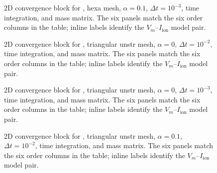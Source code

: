 \begin{figure}[p]
\centering
{}
\caption{2D convergence block for , hexa mesh, $\alpha=0.1$, $\Delta t=10^{-3}$,  time integration, and  mass matrix. The six panels match the six order columns in the table; inline labels identify the $V_m$--$I_{\mathrm{ion}}$ model pair.}
\label{fig:results-2d-picard-hexa-alpha-1p0em01-1p0em03}
\end{figure}
\FloatBarrier

\begin{figure}[p]
\centering
{}
\caption{2D convergence block for , triangular unstr mesh, $\alpha=0$, $\Delta t=10^{-2}$,  time integration, and  mass matrix. The six panels match the six order columns in the table; inline labels identify the $V_m$--$I_{\mathrm{ion}}$ model pair.}
\label{fig:results-2d-picard-triangular-unstr-alpha-0p0e00-1p0em02}
\end{figure}
\FloatBarrier

\begin{figure}[p]
\centering
{}
\caption{2D convergence block for , triangular unstr mesh, $\alpha=0$, $\Delta t=10^{-3}$,  time integration, and  mass matrix. The six panels match the six order columns in the table; inline labels identify the $V_m$--$I_{\mathrm{ion}}$ model pair.}
\label{fig:results-2d-picard-triangular-unstr-alpha-0p0e00-1p0em03}
\end{figure}
\FloatBarrier

\begin{figure}[p]
\centering
{}
\caption{2D convergence block for , triangular unstr mesh, $\alpha=0.1$, $\Delta t=10^{-2}$,  time integration, and  mass matrix. The six panels match the six order columns in the table; inline labels identify the $V_m$--$I_{\mathrm{ion}}$ model pair.}
\label{fig:results-2d-picard-triangular-unstr-alpha-1p0em01-1p0em02}
\end{figure}
\FloatBarrier

